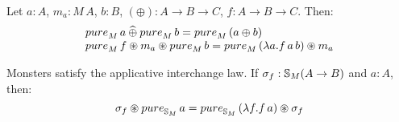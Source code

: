 \begin{lemma}\label{lemma:pure_lift}%
Let $a:A$, $m_a : M\, A$, $b:B$, $(\oplus) : A \rightarrow B \rightarrow C$, $f : A \rightarrow B \rightarrow C$. Then:
$$
\begin{array}{l}
\apure_M\, a \alift{\oplus} \apure_M\, b = \apure_M\, (a \oplus b)\\
\apure_M\, f \appl m_a \appl \apure_M\, b = \apure_M\, (\lambda a . f\, a\, b) \appl m_a
\end{array}
$$
\end{lemma}

\begin{lemma}
Monsters satisfy the applicative interchange law.
 If $\sigma_f: \mathbb{S}_{M}(A\rightarrow B)$ and $a:A$, then:
$$
\sigma_f \appl \apure_{\stream{M}}\,a = \apure_{\stream{M}}\,(\lambda f. f\,a) \appl \sigma_f
$$
\end{lemma}
